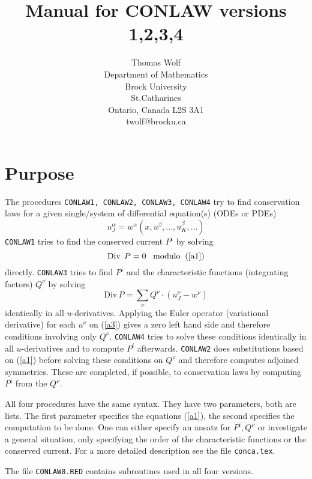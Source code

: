 \documentclass[12pt]{article}
\title{Manual for CONLAW versions 1,2,3,4}
\author{Thomas Wolf \\
        Department of Mathematics \\
        Brock University \\
        St.Catharines \\
        Ontario, Canada L2S 3A1 \\
        twolf@brocku.ca}
\begin{document}
\maketitle
\section{Purpose}
The procedures {\tt CONLAW1, CONLAW2, CONLAW3, CONLAW4}
try to find conservation laws
for a given single/system of differential equation(s) (ODEs or PDEs)
\begin{equation}
     u^{\alpha}_J = w^{\alpha}(x,u^{\beta},...,u^{\beta}_K,...)  \label{a1}
\end{equation}
{\tt CONLAW1} tries to find the conserved current $P^i$ by solving
\begin{equation}
   \mbox{Div}\;\,P = 0  \;\;\; \mbox{modulo}\;\; (\ref{a1})
\label{a2}
\end{equation}
directly. {\tt CONLAW3} tries to find $P^i$ and the characteristic
functions (integrating factors) $Q^{\nu}$ by solving
\begin{equation}
\mbox{Div}\,P = \sum_{\nu} Q^{\nu}\cdot (u^{\nu}_J - w^{\nu}) \label{a3}
\end{equation}
identically in all $u$-derivatives.
Applying the Euler operator (variational derivative) for each $u^{\nu}$
on (\ref{a3}) gives a zero left hand side and therefore
conditions involving only $Q^{\nu}$. {\tt CONLAW4} tries to solve these
conditions identically in all $u$-derivatives and to compute $P^i$
afterwards. {\tt CONLAW2}
does substitutions based on (\ref{a1}) before solving these
conditions on $Q^{\nu}$
and therefore computes adjoined symmetries. These are
completed, if possible, to conservation laws by computing $P^i$ from
the $Q^{\nu}$.

All four procedures have the same syntax. They have two parameters,
both are lists. The first parameter specifies the equations (\ref{a1}),
the second specifies the computation to be done. One can either specify an
ansatz for $P^i, Q^{\nu}$ or investigate a general situation, only specifying
the order of the characteristic functions or the conserved current. For a
more detailed description see the file {\tt conca.tex}.

The file {\tt CONLAW0.RED} contains subroutines used in all four versions.
\end{document}

